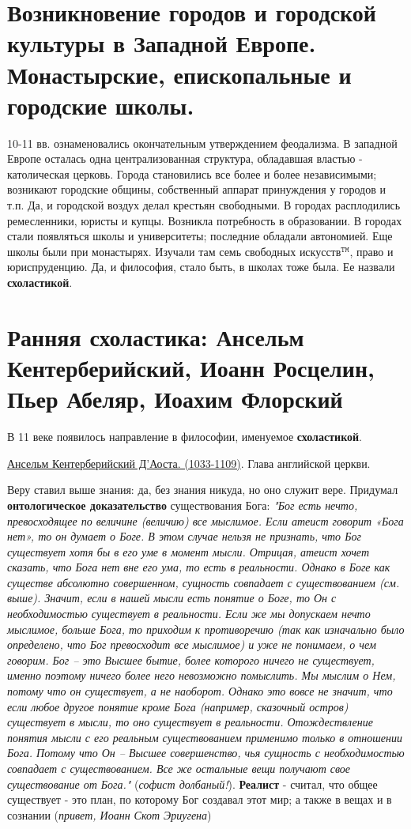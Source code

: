\section{Возникновение городов и городской культуры в Западной Европе. Монастырские, епископальные и городские школы.}
10-11 вв. ознаменовались окончательным утверждением феодализма. 
В западной Европе осталась одна централизованная структура, обладавшая властью - католическая церковь.
Города становились все более и более независимыми; возникают городские общины, собственный аппарат принуждения у городов и т.п. Да, и городской воздух делал крестьян свободными. В городах расплодились ремесленники, юристы и купцы.
Возникла потребность в образовании. В городах стали появляться школы и университеты; последние обладали автономией. Еще школы были при монастырях. Изучали там семь свободных искусств$^\mathtt{TM}$, право и юриспруденцию. Да, и философия, стало быть, в школах тоже была. Ее назвали \textbf{схоластикой}. 

\section{Ранняя схоластика: Ансельм Кентерберийский, Иоанн Росцелин, Пьер Абеляр, Иоахим Флорский}
В 11 веке появилось направление в философии, именуемое \textbf{схоластикой}. 

\underline{Ансельм Кентерберийский Д'Аоста. (1033-1109)}. Глава английской церкви.

Веру ставил выше знания: да, без знания никуда, но оно служит вере. Придумал \textbf{онтологическое доказательство} существования Бога: \textit{"Бог есть нечто, превосходящее по величине (величию) все мыслимое. Если атеист говорит «Бога нет», то он думает о Боге. В этом случае нельзя не признать, что Бог существует хотя бы в его уме в момент мысли. Отрицая, атеист хочет сказать, что Бога нет вне его ума, то есть в реальности. Однако в Боге как существе абсолютно совершенном, сущность совпадает с существованием (см. выше). Значит, если в нашей мысли есть понятие о Боге, то Он с необходимостью существует в реальности. Если же мы допускаем нечто мыслимое, больше Бога, то приходим к противоречию (так как изначально было определено, что Бог превосходит все мыслимое) и уже не понимаем, о чем говорим. Бог – это Высшее бытие, более которого ничего не существует, именно поэтому ничего более него невозможно помыслить. Мы мыслим о Нем, потому что он существует, а не наоборот. Однако это вовсе не значит, что если любое другое понятие кроме Бога (например, сказочный остров) существует в мысли, то оно существует в реальности. Отождествление понятия мысли с его реальным существованием применимо только в отношении Бога. Потому что Он – Высшее совершенство, чья сущность с необходимостью совпадает с существованием. Все же остальные вещи получают свое существование от Бога."} (\textit{софист долбаный!}). \textbf{Реалист} - считал, что общее существует  - это план, по которому Бог создавал этот мир; а также в вещах и в сознании (\textit{привет, Иоанн Скот Эриугена})


